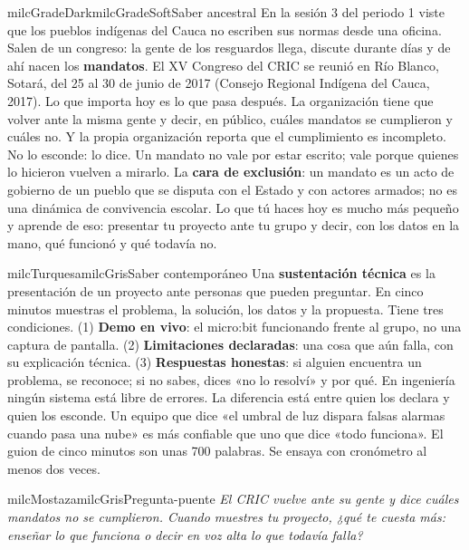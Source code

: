 \documentclass[11pt,letterpaper]{article}
\begin{document}
\begin{softbox}{milcGradeDark}{milcGradeSoft}{Saber ancestral}
En la sesión 3 del periodo 1 viste que los pueblos indígenas del Cauca no escriben sus normas desde una oficina. Salen de un congreso: la gente de los resguardos llega, discute durante días y de ahí nacen los \textbf{mandatos}. El XV Congreso del CRIC se reunió en Río Blanco, Sotará, del 25 al 30 de junio de 2017 (Consejo Regional Indígena del Cauca, 2017). Lo que importa hoy es lo que pasa después. La organización tiene que volver ante la misma gente y decir, en público, cuáles mandatos se cumplieron y cuáles no. Y la propia organización reporta que el cumplimiento es incompleto. No lo esconde: lo dice. Un mandato no vale por estar escrito; vale porque quienes lo hicieron vuelven a mirarlo. La \textbf{cara de exclusión}: un mandato es un acto de gobierno de un pueblo que se disputa con el Estado y con actores armados; no es una dinámica de convivencia escolar. Lo que tú haces hoy es mucho más pequeño y aprende de eso: presentar tu proyecto ante tu grupo y decir, con los datos en la mano, qué funcionó y qué todavía no.\par{}
\end{softbox}

\begin{softbox}{milcTurquesa}{milcGris}{Saber contemporáneo}
Una \textbf{sustentación técnica} es la presentación de un proyecto ante personas que pueden preguntar. En cinco minutos muestras el problema, la solución, los datos y la propuesta. Tiene tres condiciones. (1) \textbf{Demo en vivo}: el micro:bit funcionando frente al grupo, no una captura de pantalla. (2) \textbf{Limitaciones declaradas}: una cosa que aún falla, con su explicación técnica. (3) \textbf{Respuestas honestas}: si alguien encuentra un problema, se reconoce; si no sabes, dices «no lo resolví» y por qué. En ingeniería ningún sistema está libre de errores. La diferencia está entre quien los declara y quien los esconde. Un equipo que dice «el umbral de luz dispara falsas alarmas cuando pasa una nube» es más confiable que uno que dice «todo funciona». El guion de cinco minutos son unas 700 palabras. Se ensaya con cronómetro al menos dos veces.
\end{softbox}

\begin{softbox}{milcMostaza}{milcGris}{Pregunta-puente}
\textit{El CRIC vuelve ante su gente y dice cuáles mandatos no se cumplieron. Cuando muestres tu proyecto, ¿qué te cuesta más: enseñar lo que funciona o decir en voz alta lo que todavía falla?}
\end{softbox}
\end{document}

